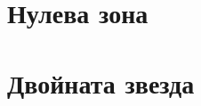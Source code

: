 \chapter{Нулева зона}
% 
% 
%     
%     
%     
%     
%     
%     
%     
%     
%     
%     
\chapter{Двойната звезда}
    
\begin{appendices}
%     
%     
%     
%     
    
\end{appendices}
